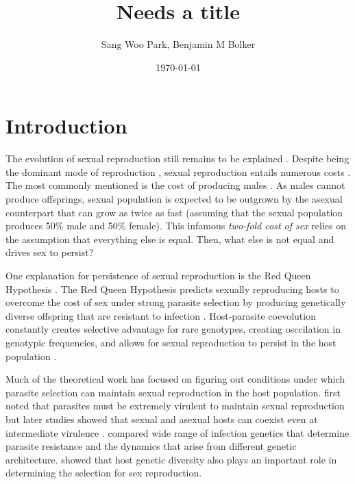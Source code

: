 \documentclass{article}\usepackage[]{graphicx}\usepackage[]{color}
\title{Needs a title}
\author{Sang Woo Park, Benjamin M Bolker}
\date{\today}
\begin{document}
\maketitle

\section{Introduction}

The evolution of sexual reproduction still remains to be explained \citep{otto2009evolutionary}.
Despite being the dominant mode of reproduction \citep{vrijenhoek1998animal}, sexual reproduction entails numerous costs \citep{lehtonen2012many}.
The most commonly mentioned is the cost of producing males \citep{smith1978evolution}.
As males cannot produce offsprings, sexual population is expected to be outgrown by the asexual counterpart that can grow as twice as fast (assuming that the sexual population produces 50\% male and 50\% female).
This infamous \emph{two-fold cost of sex} \citep{smith1978evolution} relies on the assumption that everything else is equal.
Then, what else is not equal and drives sex to persist?

One explanation for persistence of sexual reproduction is the Red Queen Hypothesis \citep{bell1982masterpiece}.
The Red Queen Hypothesis predicts sexually reproducing hosts to overcome the cost of sex under strong parasite selection by producing genetically diverse offspring that are resistant to infection \citep{jbs1949disease, jaenike1978hypothesis, hamilton1980sex}.
Host-parasite coevolution constantly creates selective advantage for rare genotypes, creating osccilation in genotypic frequencies, and allows for sexual reproduction to persist in the host population \citep{clarke1976ecological, hamilton1980sex}.

Much of the theoretical work has focused on figuring out conditions under which parasite selection can maintain sexual reproduction in the host population.
\cite{may1983epidemiology} first noted that parasites must be extremely virulent to maintain sexual reproduction but later studies showed that sexual and asexual hosts can coexist even at intermediate virulence \citep{howard1994parasitism}.
\cite{agrawal2002infection} compared wide range of infection genetics that determine parasite resistance and the dynamics that arise from different genetic architecture.
\cite{ashby2015diversity} showed that host genetic diversity also plays an important role in determining the selection for sex reproduction.
\end{document}
